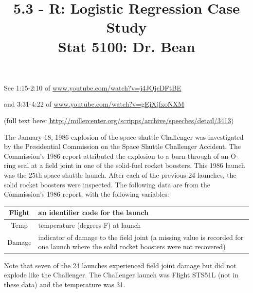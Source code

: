 \documentclass{article}\usepackage[]{graphicx}\usepackage[]{color}
\begin{document}
\title{%
  5.3 - R: Logistic Regression Case Study \\
  \smallskip
  \large Stat 5100: Dr. Bean
}
\date{}

\maketitle

See 1:15-2:10 of \href{www.youtube.com/watch?v=j4JOjcDFtBE}{www.youtube.com/watch?v=j4JOjcDFtBE}

and 3:31-4:22 of \href{www.youtube.com/watch?v=gEjXjfxoNXM}{www.youtube.com/watch?v=gEjXjfxoNXM}

(full text here:
\href{http://millercenter.org/scripps/archive/speeches/detail/3413}{http://millercenter.org/scripps/archive/speeches/detail/3413})

The January 18, 1986 explosion of the space shuttle Challenger was investigated by the
Presidential Commission on the Space Shuttle Challenger Accident. The Commission's
1986 report attributed the explosion to a burn through of an O-ring seal at a field joint in
one of the solid-fuel rocket boosters. This 1986 launch was the 25th space shuttle launch.
After each of the previous 24 launches, the solid rocket boosters were inspected.
The following data are from the Commission's 1986 report, with the following variables:

\begin{center}
\begin{tabular}{|c|p{8cm}|}
\hline
Flight & an identifier code for the launch \\
\hline
Temp & temperature (degrees F) at launch \\
\hline
Damage & indicator of damage to the field joint (a missing value is recorded for one launch where the solid rocket boosters were not recovered) \\
\hline
\end{tabular}
\end{center}

Note that seven of the 24 launches experienced field joint damage but did not explode
like the Challenger. The Challenger launch was Flight STS51L (not in these data)
and the temperature was 31.
\end{document}
